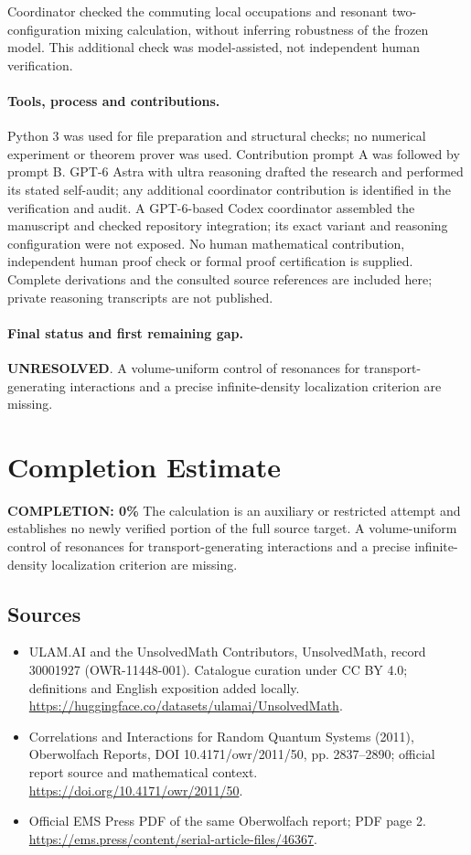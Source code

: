 \documentclass[11pt]{article}
\begin{document}
Coordinator checked the commuting local occupations and resonant two-configuration mixing calculation, without inferring robustness of the frozen model. This additional check was model-assisted, not independent human verification.

\paragraph{Tools, process and contributions.}
Python 3 was used for file preparation and structural checks; no numerical experiment or theorem prover was used. Contribution prompt A was followed by prompt B. GPT-6 Astra with ultra reasoning drafted the research and performed its stated self-audit; any additional coordinator contribution is identified in the verification and audit. A GPT-6-based Codex coordinator assembled the manuscript and checked repository integration; its exact variant and reasoning configuration were not exposed. No human mathematical contribution, independent human proof check or formal proof certification is supplied. Complete derivations and the consulted source references are included here; private reasoning transcripts are not published.

\paragraph{Final status and first remaining gap.}
\textbf{UNRESOLVED}. A volume-uniform control of resonances for transport-generating interactions and a precise infinite-density localization criterion are missing.

\section{Completion Estimate}
\noindent\textbf{COMPLETION: 0\%}
The calculation is an auxiliary or restricted attempt and establishes no newly verified portion of the full source target. A volume-uniform control of resonances for transport-generating interactions and a precise infinite-density localization criterion are missing.

\subsection{Sources}
\begin{itemize}
\item[\hypertarget{source:30001927:1}{S1}] ULAM.AI and the UnsolvedMath Contributors, UnsolvedMath, record 30001927 (OWR-11448-001). Catalogue curation under CC BY 4.0; definitions and English exposition added locally.
\url{https://huggingface.co/datasets/ulamai/UnsolvedMath}.
\item[\hypertarget{source:30001927:2}{S2}] Correlations and Interactions for Random Quantum Systems (2011), Oberwolfach Reports, DOI 10.4171/owr/2011/50, pp. 2837--2890; official report source and mathematical context.
\url{https://doi.org/10.4171/owr/2011/50}.
\item[\hypertarget{source:30001927:3}{S3}] Official EMS Press PDF of the same Oberwolfach report; PDF page 2.
\url{https://ems.press/content/serial-article-files/46367}.
\end{itemize}
\label{end:30001927}
\end{document}
